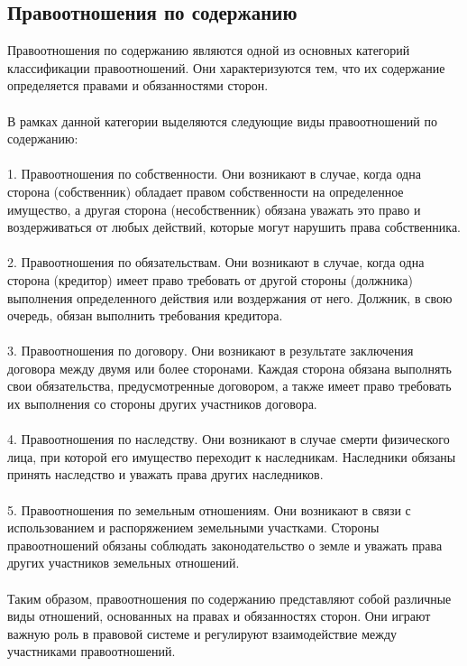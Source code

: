 \documentclass{article}
\begin{document}
\subsection{Правоотношения по содержанию}
Правоотношения по содержанию являются одной из основных категорий классификации правоотношений. Они характеризуются тем, что их содержание определяется правами и обязанностями сторон.\\
~\\
В рамках данной категории выделяются следующие виды правоотношений по содержанию:\\
~\\
1. Правоотношения по собственности. Они возникают в случае, когда одна сторона (собственник) обладает правом собственности на определенное имущество, а другая сторона (несобственник) обязана уважать это право и воздерживаться от любых действий, которые могут нарушить права собственника.\\
~\\
2. Правоотношения по обязательствам. Они возникают в случае, когда одна сторона (кредитор) имеет право требовать от другой стороны (должника) выполнения определенного действия или воздержания от него. Должник, в свою очередь, обязан выполнить требования кредитора.\\
~\\
3. Правоотношения по договору. Они возникают в результате заключения договора между двумя или более сторонами. Каждая сторона обязана выполнять свои обязательства, предусмотренные договором, а также имеет право требовать их выполнения со стороны других участников договора.\\
~\\
4. Правоотношения по наследству. Они возникают в случае смерти физического лица, при которой его имущество переходит к наследникам. Наследники обязаны принять наследство и уважать права других наследников.\\
~\\
5. Правоотношения по земельным отношениям. Они возникают в связи с использованием и распоряжением земельными участками. Стороны правоотношений обязаны соблюдать законодательство о земле и уважать права других участников земельных отношений.\\
~\\
Таким образом, правоотношения по содержанию представляют собой различные виды отношений, основанных на правах и обязанностях сторон. Они играют важную роль в правовой системе и регулируют взаимодействие между участниками правоотношений.
\end{document}

